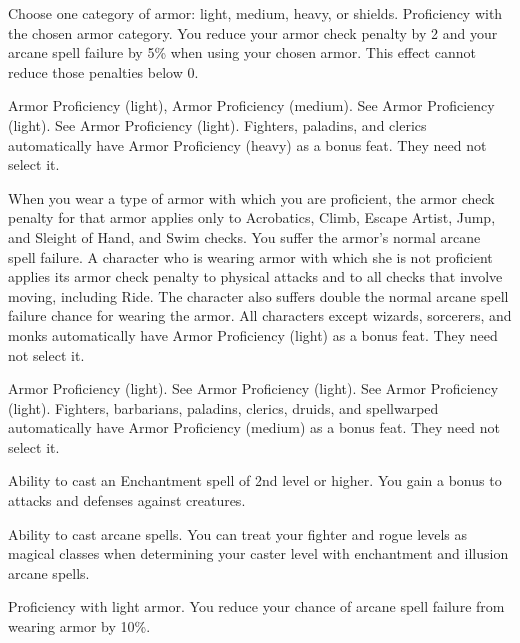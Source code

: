 Choose one category of armor: light, medium, heavy, or shields.
 Proficiency with the chosen armor category.
 You reduce your armor check penalty by 2 and your arcane spell failure by 5\% when using your chosen armor. This effect cannot reduce those penalties below 0.

 Armor Proficiency (light), Armor Proficiency (medium).
 See Armor Proficiency (light).
 See Armor Proficiency (light).
 Fighters, paladins, and clerics automatically have Armor Proficiency (heavy) as a bonus feat. They need not select it.

 When you wear a type of armor with which you are proficient, the armor check penalty for that armor applies only to Acrobatics, Climb, Escape Artist, Jump, and Sleight of Hand, and Swim checks. You suffer the armor's normal arcane spell failure.
 A character who is wearing armor with which she is not proficient applies its armor check penalty to physical attacks and to all checks that involve moving, including Ride. The character also suffers double the normal arcane spell failure chance for wearing the armor.
 All characters except wizards, sorcerers, and monks automatically have Armor Proficiency (light) as a bonus feat. They need not select it.

 Armor Proficiency (light).
 See Armor Proficiency (light).
 See Armor Proficiency (light).
 Fighters, barbarians, paladins, clerics, druids, and spellwarped automatically have Armor Proficiency (medium) as a bonus feat. They need not select it.

\featpre Ability to cast an Enchantment spell of 2nd level or higher.
\featben You gain a  bonus to attacks and defenses against \bewildered creatures.
\featspecial \featbanenotes

\featpre Ability to cast arcane spells.
\featben You can treat your fighter and rogue levels as magical classes when determining your caster level with enchantment and illusion arcane spells.

\featpre Proficiency with light armor.
\featben You reduce your chance of arcane spell failure from wearing armor by 10\%.

